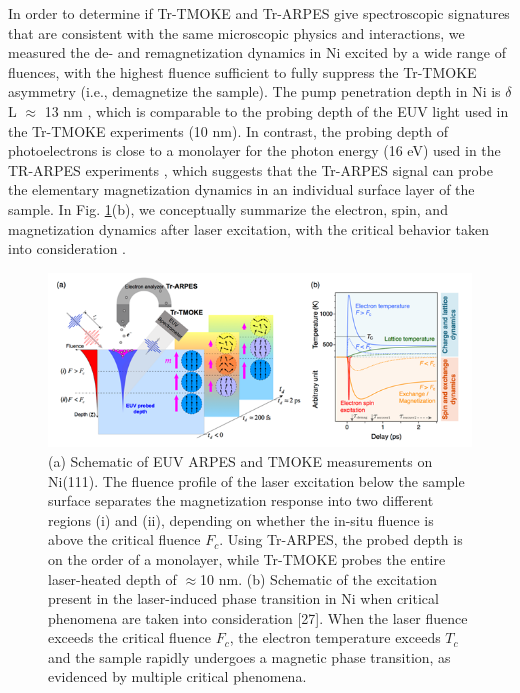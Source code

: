 In order to determine if Tr-TMOKE and Tr-ARPES give spectroscopic signatures that are consistent with the same microscopic physics and interactions, we measured the de- and remagnetization dynamics in Ni excited by a wide range of fluences, with the highest fluence sufficient to fully suppress the Tr-TMOKE asymmetry (i.e., demagnetize the sample). The pump penetration depth in Ni is $\delta$L $\approx$ 13 nm \cite{B.Johnson1974}, which is comparable to the probing depth of the EUV light used in the Tr-TMOKE experiments (10 nm). In contrast, the probing depth of photoelectrons is close to a monolayer for the photon energy (16 eV) used in the TR-ARPES experiments \cite{Tao2016}, which suggests that the Tr-ARPES signal can probe the elementary magnetization dynamics in an individual surface layer of the sample. In Fig. \ref{fig: PRLfig1}(b), we conceptually summarize the electron, spin, and magnetization dynamics after laser excitation, with the critical behavior taken into consideration \cite{Tengdin2018}.

\begin{figure}
	\label{fig: PRLfig1}
\begin{center}
	\includegraphics[width=150mm]{figs/PRLFig1}
\end{center}
\caption{(a) Schematic of EUV ARPES and TMOKE measurements on Ni(111). The fluence profile of the laser excitation below the sample surface separates the magnetization response into two different regions (i) and (ii), depending on whether the in-situ fluence is above the critical fluence $F_c$. Using Tr-ARPES, the probed depth is on the order of a monolayer, while Tr-TMOKE probes the entire laser-heated depth of $\approx$10 nm. (b) Schematic of the excitation present in the laser-induced phase transition in Ni when critical phenomena are taken into consideration [27]. When the laser fluence exceeds the critical fluence $F_c$, the electron temperature exceeds $T_c$ and the sample rapidly undergoes a magnetic phase transition, as evidenced by multiple critical phenomena.}
\end{figure}

